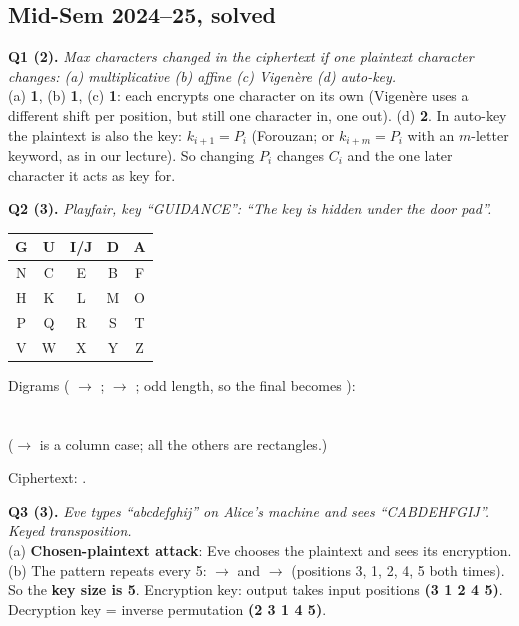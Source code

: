 \subsection{Mid-Sem 2024--25, solved}

\textbf{Q1 (2).} \emph{Max characters changed in the ciphertext if one plaintext character changes: (a) multiplicative (b) affine (c) Vigen\`ere (d) auto-key.}\\
(a) \textbf{1}, (b) \textbf{1}, (c) \textbf{1}: each encrypts one character on its own (Vigen\`ere uses a different shift per position, but still one character in, one out).
(d) \textbf{2}. In auto-key the plaintext is also the key: $k_{i+1} = P_i$ (Forouzan; or $k_{i+m} = P_i$ with an $m$-letter keyword, as in our lecture). So changing $P_i$ changes $C_i$ and the one later character it acts as key for.

\textbf{Q2 (3).} \emph{Playfair, key ``GUIDANCE'': ``The key is hidden under the door pad''.}
\begin{center}\small
\begin{minipage}[c]{0.25\textwidth}\centering
\begin{tabular}{|*{5}{c|}}\hline G&U&I/J&D&A\\\hline N&C&E&B&F\\\hline H&K&L&M&O\\\hline P&Q&R&S&T\\\hline V&W&X&Y&Z\\\hline\end{tabular}
\end{minipage}
\begin{minipage}[c]{0.7\textwidth}
Digrams ( $\to$ ;  $\to$ ; odd length, so the final  becomes ):\\
\\[2pt]
\\[2pt]
($\to$ is a column case; all the others are rectangles.)
\end{minipage}
\end{center}
Ciphertext: \textbf{}.

\textbf{Q3 (3).} \emph{Eve types ``abcdefghij'' on Alice's machine and sees ``CABDEHFGIJ''. Keyed transposition.}\\
(a) \textbf{Chosen-plaintext attack}: Eve chooses the plaintext and sees its encryption.
(b) The pattern repeats every 5: $\to$ and $\to$ (positions 3, 1, 2, 4, 5 both times). So the \textbf{key size is 5}.
Encryption key: output takes input positions \textbf{(3 1 2 4 5)}. Decryption key = inverse permutation \textbf{(2 3 1 4 5)}.

